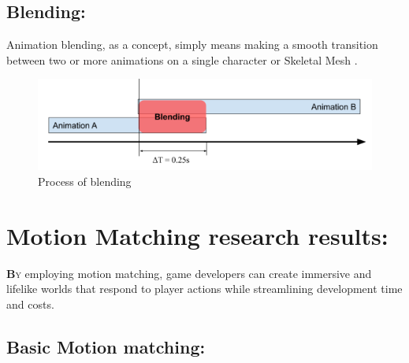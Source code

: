 \documentclass[12pt]{book}
\begin{document}
\subsection{Blending:}
Animation blending, as a concept, simply means making a smooth transition between two or
more animations on a single character or Skeletal Mesh \cite{url-5}.
\begin{figure}[h!]
    \centering
    \includegraphics[scale=0.7]{./Figures/Images/Blending.jpg}
    \caption{Process of blending}
    \label{Process of blending}
\end{figure}

\section{Motion Matching research results:}
\label{appendix:MM}
\lettrine[findent=1pt]{\textbf{B}}{y} employing motion matching, game developers can
create immersive and lifelike worlds that respond to player actions while streamlining development time and costs.

\subsection{Basic Motion matching:}
\end{document}
